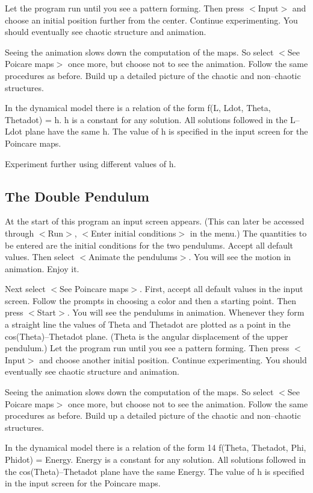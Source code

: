    Let the program run until you see a pattern forming. Then press
$<$Input$>$ and choose an initial position further from the center.
Continue experimenting. You should eventually see chaotic structure
and animation.

   Seeing the animation slows down the computation of the maps. So
select $<$See Poicare maps$>$ once more, but choose not to see the animation.
Follow the same procedures as before. Build up a detailed picture of the
chaotic and non--chaotic structures.

   In the dynamical model there is a relation of the form
          f(L, Ldot, Theta, Thetadot) = h.
h is a constant for any solution. All solutions followed in the L--Ldot
plane have the same h. The value of h is specified in the input screen
for the Poincare maps.

   Experiment further using different values of h.



\subsection{The Double Pendulum}

   At the start of this program an input screen appears. (This can
later be accessed through $<$Run$>$, $<$Enter initial conditions$>$ in the menu.)
The quantities to be entered are the initial conditions for the two
pendulums. Accept all default values. Then select $<$Animate the pendulums$>$.
You will see the motion in animation. Enjoy it.

   Next select $<$See Poincare maps$>$. First, accept all default values in
the input screen. Follow the prompts in choosing a color and then a
starting point. Then press $<$Start$>$. You will see the pendulums in
animation. Whenever they form a straight line the values of Theta and
Thetadot are plotted as a point in the cos(Theta)--Thetadot plane. (Theta is
the angular displacement of the upper pendulum.) Let the program run
until you see a pattern forming. Then press $<$Input$>$ and choose another
initial position. Continue experimenting. You should eventually see
chaotic structure and animation.

   Seeing the animation slows down the computation of the maps. So
select $<$See Poicare maps$>$ once more, but choose not to see the
animation. Follow the same procedures as before. Build up a detailed
picture of the chaotic and non--chaotic structures.

   In the dynamical model there is a relation of the form                                    14
            f(Theta, Thetadot, Phi, Phidot) = Energy.
Energy is a constant for any solution. All solutions followed in the
cos(Theta)--Thetadot plane have the same Energy. The value of h is specified
in the input screen for the Poincare maps.

